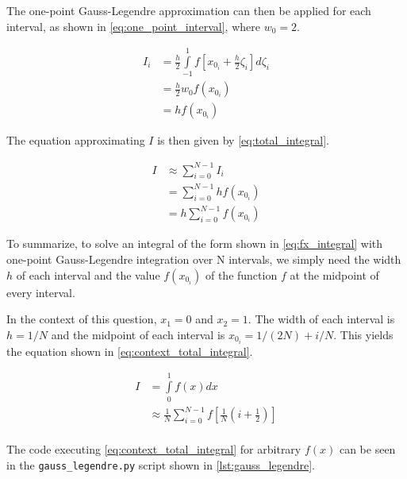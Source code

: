 \documentclass[a4paper,titlepage]{article}
\newcommand{\code}[1]{\texttt{#1}}
\begin{document}
	The one-point Gauss-Legendre approximation can then be applied for each interval, as shown in \cref{eq:one_point_interval}, where $w_0 = 2$.
	
	\begin{equation} \label{eq:one_point_interval}
		\begin{split}
			I_i &= \frac{h}{2} \int\limits_{-1}^{1} f \left[x_{0_i} + \frac{h}{2} \zeta_i\right] d\zeta_i \\
			&= \frac{h}{2} w_0 f(x_{0_i}) \\
			&= h f(x_{0_i})
		\end{split}
	\end{equation}
	
	The equation approximating $I$ is then given by \cref{eq:total_integral}.
	
	\begin{equation} \label{eq:total_integral}
		\begin{split}
				I &\approx \sum_{i=0}^{N-1} I_i \\
				&= \sum_{i=0}^{N-1} h f(x_{0_i}) \\
				&= h \sum_{i=0}^{N-1} f(x_{0_i})
		\end{split}
	\end{equation}
	
	To summarize, to solve an integral of the form shown in \cref{eq:fx_integral} with one-point Gauss-Legendre integration over N intervals, we simply need the width $h$ of each interval and the value $f(x_{0_i})$ of the function $f$ at the midpoint of every interval.
	
	In the context of this question, $x_1 = 0$ and $x_2 = 1$. The width of each interval is $h = 1/N$ and the midpoint of each interval is $x_{0_i} = 1/(2N) + i/N$. This yields the equation shown in \cref{eq:context_total_integral}.
	
	\begin{equation} \label{eq:context_total_integral}
		\begin{split}
			I &= \int\limits_{0}^{1} f(x) dx  \\
			&\approx \frac{1}{N} \sum_{i=0}^{N-1} f\left[ \frac{1}{N} \left(i + \frac{1}{2} \right) \right] \\
		\end{split}
	\end{equation}
	
	The code executing \cref{eq:context_total_integral} for arbitrary $f(x)$ can be seen in the \code{gauss\_legendre.py} script shown in \cref{lst:gauss_legendre}.
	
\end{document}
